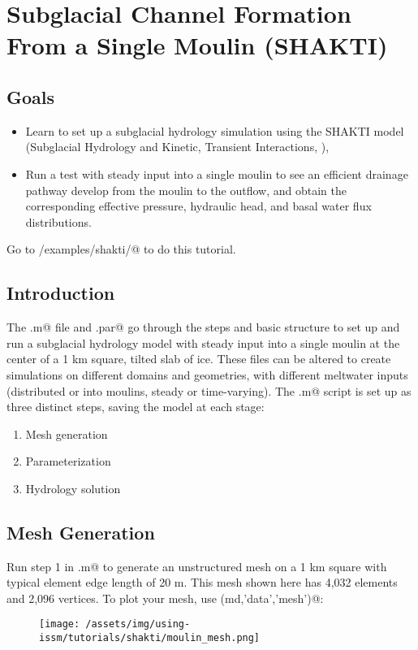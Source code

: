 \section{Subglacial Channel Formation From a Single Moulin (SHAKTI)}
\subsection{Goals} %
\begin{itemize}
	\item Learn to set up a subglacial hydrology simulation using the SHAKTI model (Subglacial Hydrology and Kinetic, Transient Interactions, \cite{Sommers2018}),
	\item Run a test with steady input into a single moulin to see an efficient drainage pathway develop from the moulin to the outflow, and obtain the corresponding effective pressure, hydraulic head, and basal water flux distributions.
\end{itemize} 

Go to \verb@trunk/examples/shakti/@ to do this tutorial.
\subsection{Introduction}
The \verb@runme.m@ file and \verb@moulin.par@ go through the steps and basic structure to set up and run a subglacial hydrology model with steady input into a single moulin at the center of a 1 km square, tilted slab of ice. These files can be altered to create simulations on different domains and geometries, with different meltwater inputs (distributed or into moulins, steady or time-varying). The \verb@runme.m@ script is set up as three distinct steps, saving the model at each stage:
\begin{enumerate}
	\item Mesh generation
	\item Parameterization
	\item Hydrology solution
\end{enumerate}

\subsection{Mesh Generation}
Run step 1 in \verb@runme.m@ to generate an unstructured mesh on a 1 km square with typical element edge length of 20 m. This mesh shown here has 4,032 elements and 2,096 vertices. To plot your mesh, use \verb@plotmodel(md,'data','mesh')@:
\begin{figure}[H]
	\begin{center}
		\texttt{[image: /assets/img/using-issm/tutorials/shakti/moulin\_mesh.png]}
	\end{center}
\end{figure}


